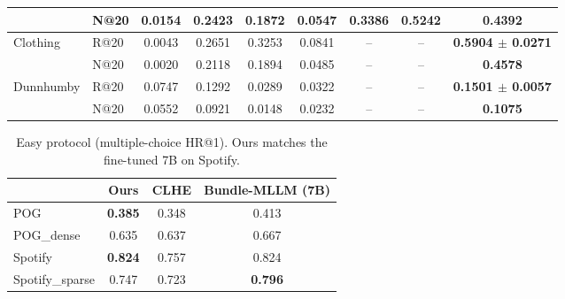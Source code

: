\begin{table}[t]
\begin{tabular}{llccccccc}
                                & N@20 & 0.0154 & 0.2423 & 0.1872 & 0.0547 & 0.3386 & \textbf{0.5242} & 0.4392 \\
\midrule
\multirow{2}{*}{Clothing}       & R@20 & 0.0043 & 0.2651 & 0.3253 & 0.0841 & --     & --     & \textbf{0.5904 $\pm$ 0.0271} \\
                                & N@20 & 0.0020 & 0.2118 & 0.1894 & 0.0485 & --     & --     & \textbf{0.4578} \\
\midrule
\multirow{2}{*}{Dunnhumby}      & R@20 & 0.0747 & 0.1292 & 0.0289 & 0.0322 & --     & --     & \textbf{0.1501 $\pm$ 0.0057} \\
                                & N@20 & 0.0552 & 0.0921 & 0.0148 & 0.0232 & --     & --     & \textbf{0.1075} \\
\bottomrule
\end{tabular}
\end{table}

\begin{table}[t]\centering\small
\caption{Easy protocol (multiple-choice HR@1). Ours matches the fine-tuned 7B on Spotify.}
\label{tab:mc}
\begin{tabular}{lccc}
\toprule
 & Ours & CLHE & Bundle-MLLM (7B) \\
\midrule
POG            & \textbf{0.385} & 0.348 & 0.413 \\
POG\_dense     & 0.635 & 0.637 & 0.667 \\
Spotify        & \textbf{0.824} & 0.757 & 0.824 \\
Spotify\_sparse& 0.747 & 0.723 & \textbf{0.796} \\
\bottomrule
\end{tabular}
\end{table}

